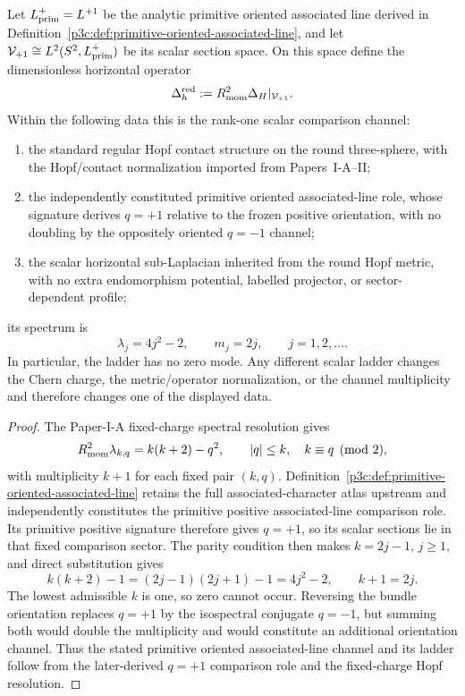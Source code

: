\documentclass[12pt,a4paper]{article}
\begin{document}
\begin{proposition}
\label{p3:prop:reduced-hopf-scalar-channel-uniqueness}
Let \(L_{\rm prim}^{+}=L^{+1}\) be the analytic primitive oriented associated
line derived in Definition~\ref{p3c:def:primitive-oriented-associated-line},
and let
\(\mathcal V_{+1}\cong L^2(S^2,L_{\rm prim}^{+})\) be its scalar section
space.  On this space define the dimensionless horizontal operator
\[
       \Delta_h^{\rm red}:=R_{\mathrm{mom}}^2\Delta_H|_{\mathcal V_{+1}}.
\]
Within the following data this is the rank-one scalar comparison channel:
\begin{enumerate}[label=(\roman*),leftmargin=2.1em]
\item the standard regular Hopf contact structure on the round three-sphere, with the
Hopf/contact normalization imported from Papers~I-A--II;
\item the independently constituted primitive oriented associated-line role,
whose signature derives \(q=+1\) relative to the frozen positive orientation,
with no doubling by the oppositely oriented \(q=-1\) channel;
\item the scalar horizontal sub-Laplacian inherited from the round Hopf metric,
with no extra endomorphism potential, labelled projector, or sector-dependent profile;
\end{enumerate}
its spectrum is
\begin{equation}
\label{p3:eq:reduced-hopf-unique-ladder}
        \lambda_j=4j^2-2,
        \qquad
        m_j=2j,
        \qquad j=1,2,\ldots .
\end{equation}
In particular, the ladder has no zero mode.  Any different scalar ladder changes the
Chern charge, the metric/operator normalization, or the channel multiplicity and
therefore changes one of the displayed data.
\end{proposition}

\begin{proof}
The Paper-I-A fixed-charge spectral resolution gives
\[
 R_{\mathrm{mom}}^2\lambda_{k,q}=k(k+2)-q^2,
 \qquad |q|\le k,\quad k\equiv q\pmod2,
\]
with multiplicity \(k+1\) for each fixed pair \((k,q)\).  Definition~\ref{p3c:def:primitive-oriented-associated-line} retains the full
associated-character atlas upstream and independently constitutes the primitive
positive associated-line comparison role.  Its primitive positive signature
therefore gives \(q=+1\), so its scalar sections lie in that fixed comparison
sector.  The parity condition then makes
\(k=2j-1\), \(j\ge1\), and direct substitution gives
\[
 k(k+2)-1=(2j-1)(2j+1)-1=4j^2-2,
 \qquad k+1=2j.
\]
The lowest admissible \(k\) is one, so zero cannot occur.  Reversing the bundle
orientation replaces \(q=+1\) by the isospectral conjugate \(q=-1\), but
summing both would double the multiplicity and would constitute an additional
orientation channel.  Thus the stated primitive oriented associated-line channel and its
ladder follow from the later-derived \(q=+1\) comparison role and the fixed-charge Hopf resolution.
\end{proof}
\end{document}
